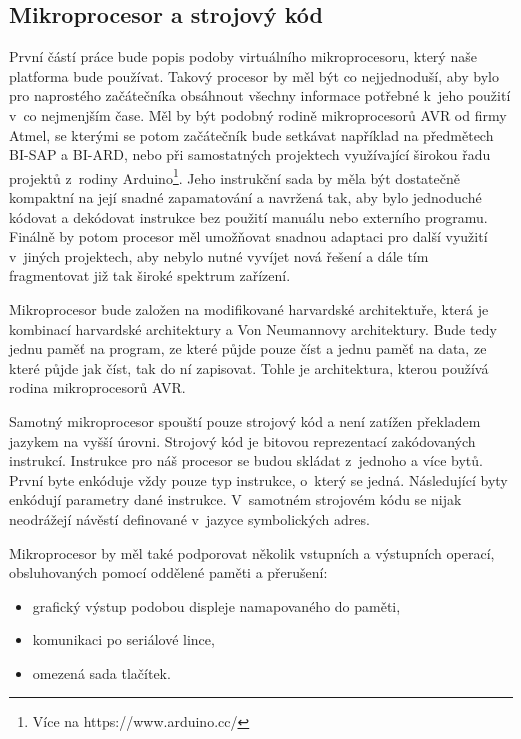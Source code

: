 \subsection{Mikroprocesor a strojový kód}

První částí práce bude popis podoby virtuálního mikroprocesoru, který naše platforma bude používat. Takový procesor by měl být co nejjednoduší, aby bylo pro naprostého začátečníka obsáhnout všechny informace potřebné k~jeho použití v~co nejmenjším čase. Měl by být podobný rodině mikroprocesorů AVR od firmy Atmel, se kterými se potom začátečník bude setkávat například na předmětech BI-SAP a BI-ARD, nebo při samostatných projektech využívající širokou řadu projektů z~rodiny Arduino\footnote{Více na https://www.arduino.cc/}. Jeho instrukční sada by měla být dostatečně kompaktní na její snadné zapamatování a navržená tak, aby bylo jednoduché kódovat a dekódovat instrukce bez použití manuálu nebo externího programu. Finálně by potom procesor měl umožňovat snadnou adaptaci pro další využití v~jiných projektech, aby nebylo nutné vyvíjet nová řešení a dále tím fragmentovat již tak široké spektrum zařízení.

Mikroprocesor bude založen na modifikované harvardské architektuře, kte\-rá je kombinací harvardské architektury a Von Neumannovy architektury. Bude tedy jednu paměť na program, ze které půjde pouze číst a jednu paměť na data, ze které půjde jak číst, tak do ní zapisovat. Tohle je architektura, kterou používá rodina mikroprocesorů AVR\cite{attiny12-datasheet}.

Samotný mikroprocesor spouští pouze strojový kód a není zatížen pře\-kla\-dem jazykem na vyšší úrovni. Strojový kód je bitovou reprezentací za\-kó\-do\-va\-ných instrukcí. Instrukce pro náš procesor se budou skládat z~jednoho a více bytů. První byte enkóduje vždy pouze typ instrukce, o~který se jedná. Následující byty enkódují parametry dané instrukce. V~samotném strojovém kódu se nijak neodrážejí návěstí definované v~jazyce symbolických adres.

Mikroprocesor by měl také podporovat několik vstupních a výstupních operací, obsluhovaných pomocí oddělené paměti a přerušení:

\begin{itemize}
	\item grafický výstup podobou displeje namapovaného do paměti,
	\item komunikaci po seriálové lince,
	\item omezená sada tlačítek.
\end{itemize}

